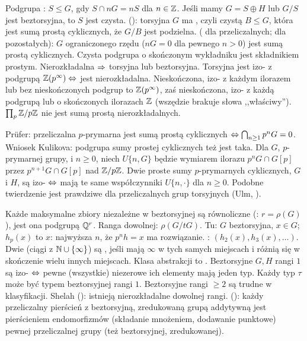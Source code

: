 Podgrupa  : $S \le G$, gdy $S \cap nG = nS$ dla $n \in \mathbb{Z}$.
Jeśli mamy $G = S \oplus H$ lub $G/S$ jest beztorsyjna, to $S$ jest czysta.
 (): torsyjna $G$ ma , czyli czystą $B \le G$, która jest sumą prostą cyklicznych, że $G/B$ jest podzielna.
 ( dla przeliczalnych;  dla pozostałych): $G$ ograniczonego rzędu ($nG = 0$ dla pewnego $n > 0$) jest sumą prostą cyklicznych.
Czysta podgrupa o skończonym wykładniku jest składnikiem prostym.
Nierozkładalna $\Rightarrow$ torsyjna lub beztorsyjna.
Torsyjna jest izo- z podgrupą $\mathbb{Z}(p^\infty) \Leftrightarrow$ jest nierozkładalna.
Nieskończona, izo- z każdym ilorazem lub bez nieskończonych podgrup to $\mathbb{Z}(p^\infty)$, zaś nieskończona, izo- z każdą podgrupą lub o skończonych ilorazach $\mathbb{Z}$ (wszędzie brakuje słowa ,,właściwy'').
$\prod_p \mathbb{Z}/p\mathbb{Z}$ nie jest sumą prostą nierozkładalnych.

Prüfer: przeliczalna $p$-prymarna jest sumą prostą cyklicznych $\Leftrightarrow \bigcap_{n \ge 1} p^n G = 0$.
Wniosek Kulikova: podgrupa sumy prostej cyklicznych też jest taka.
Dla $G$, $p$-prymarnej grupy, i $n \ge 0$, niech $U\{n, G\}$ będzie wymiarem ilorazu $p^nG \cap G[p]$ przez $p^{n+1} G  \cap G[p]$ nad $\mathbb{Z}/p\mathbb{Z}$.
Dwie proste sumy  $p$-prymarnych cyklicznych, $G$ i $H$, są izo- $\Leftrightarrow$ mają te same współczynniki $U\{n, \cdot\}$ dla $n \ge 0$.
Podobne twierdzenie jest prawdziwe dla przeliczalnych grup torsyjnych (Ulm, ).

Każde  maksymalne zbiory niezależne w beztorsyjnej są równoliczne (: $r = \rho(G)$), jest ona podgrupą $\mathbb{Q}^r$.
Ranga dowolnej: $\rho(G/tG)$.
Tu: $G$ beztorsyjna, $x \in G$; $h_p(x)$ to  $x$: najwyższa $n$, że $p^nh = x$ ma rozwiązanie.
: $(h_2(x), h_3(x), \ldots)$.
Dwie  (ciągi z $\mathbb{N} \cup \{\infty\}$) są , jeśli mają $\infty$ w tych samych miejscach i różnią się w skończenie wielu innych miejscach.
Klasa abstrakcji to .
Beztorsyjne $G, H$ rangi $1$ są izo- $\Leftrightarrow$ pewne (wszystkie) niezerowe ich elementy mają jeden typ.
Każdy typ $\tau$ może być typem beztorsyjnej rangi $1$.
Beztorsyjne rangi $\ge 2$ są trudne w klasyfikacji.
Shelah (): istnieją nierozkładalne dowolnej rangi.
 (): każdy przeliczalny pierścień z beztorsyjną, zredukowaną grupą addytywną jest pierścieniem endomorfizmów (składanie mnożeniem, dodawanie punktowe) pewnej przeliczalnej grupy (też beztorsyjnej, zredukowanej).
